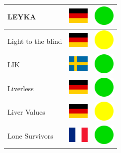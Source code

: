 \documentclass[12pt, a4paper, twoside]{report}
\begin{document}
\begin{center}
\begin{longtable}{|p{5cm}|p{2cm}|p{2cm}|}
 LEYKA                                                      & \includegraphics[width=1cm]{../4x3/de} &   \includegraphics[width=1cm]{../likes/y} \\ \hline
 Light to the blind                                         & \includegraphics[width=1cm]{../4x3/de} &   \includegraphics[width=1cm]{../likes/m} \\ \hline
 LIK                                                        & \includegraphics[width=1cm]{../4x3/se} &   \includegraphics[width=1cm]{../likes/y} \\ \hline
 Liverless                                                  & \includegraphics[width=1cm]{../4x3/de} &   \includegraphics[width=1cm]{../likes/y} \\ \hline
 Liver Values                                               & \includegraphics[width=1cm]{../4x3/de} &   \includegraphics[width=1cm]{../likes/m} \\ \hline
 Lone Survivors                                             & \includegraphics[width=1cm]{../4x3/fr} &   \includegraphics[width=1cm]{../likes/y} \\ \hline

\end{longtable}
\end{center}
\end{document}
